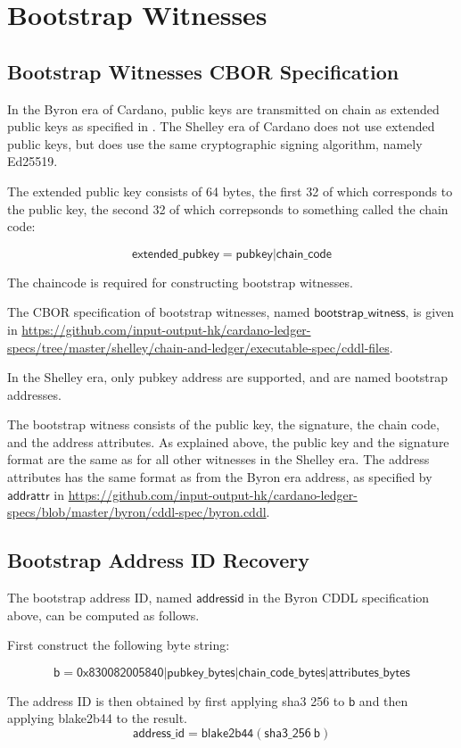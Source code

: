 \section{Bootstrap Witnesses}
\label{sec:bootstrap-witnesses}

\subsection{Bootstrap Witnesses CBOR Specification}

In the Byron era of Cardano, public keys are transmitted
on chain as extended public keys as specified in \cite{bip32}.
The Shelley era of Cardano does not use extended public keys,
but does use the same cryptographic signing algorithm,
namely Ed25519.

The extended public key consists of 64 bytes,
the first 32 of which corresponds to the public key,
the second 32 of which correpsonds to something called the chain code:

$$\mathsf{extended\_pubkey} = \mathsf{pubkey}|\mathsf{chain\_code}$$

The chaincode is required for constructing bootstrap witnesses.

The CBOR specification of bootstrap witnesses,
named $\mathsf{bootstrap\_witness}$,
is given in
\url{https://github.com/input-output-hk/cardano-ledger-specs/tree/master/shelley/chain-and-ledger/executable-spec/cddl-files}.

In the Shelley era, only pubkey address are supported,
and are named bootstrap addresses.

The bootstrap witness consists of the public key, the signature,
the chain code, and the address attributes.
As explained above, the public key and the signature format
are the same as for all other witnesses in the Shelley era.
The address attributes has the same format as from the Byron era address,
as specified by $\mathsf{addrattr}$ in
\url{https://github.com/input-output-hk/cardano-ledger-specs/blob/master/byron/cddl-spec/byron.cddl}.


\subsection{Bootstrap Address ID Recovery}

The bootstrap address ID, named $\mathsf{addressid}$ in the Byron CDDL
specification above, can be computed as follows.

First construct the following byte string:

$$\mathsf{b} =
  \mathsf{0x830082005840}
  | \mathsf{pubkey\_bytes}
  | \mathsf{chain\_code\_bytes}
  | \mathsf{attributes\_bytes}
$$

The address ID is then obtained by first applying
sha3 256 to $\mathsf{b}$ and then applying blake2b44 to the result.
$$\mathsf{address\_id} =
  \mathsf{blake2b44}(\mathsf{sha3\_256}~\mathsf{b})
$$
